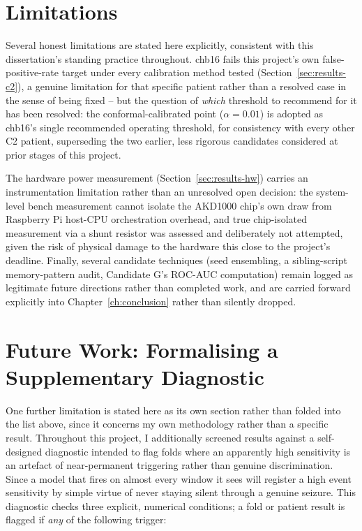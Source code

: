 \section{Limitations}

Several honest limitations are stated here explicitly, consistent with this dissertation's standing practice throughout. chb16 fails this project's own false-positive-rate target under every calibration method tested (Section~\ref{sec:results-c2}), a genuine limitation for that specific patient rather than a resolved case in the sense of being fixed -- but the question of \emph{which} threshold to recommend for it has been resolved: the conformal-calibrated point ($\alpha=0.01$) is adopted as chb16's single recommended operating threshold, for consistency with every other C2 patient, superseding the two earlier, less rigorous candidates considered at prior stages of this project.

The hardware power measurement (Section~\ref{sec:results-hw}) carries an instrumentation limitation rather than an unresolved open decision: the system-level bench measurement cannot isolate the AKD1000 chip's own draw from Raspberry Pi host-CPU orchestration overhead, and true chip-isolated measurement via a shunt resistor was assessed and deliberately not attempted, given the risk of physical damage to the hardware this close to the project's deadline. Finally, several candidate techniques (seed ensembling, a sibling-script memory-pattern audit, Candidate G's ROC-AUC computation) remain logged as legitimate future directions rather than completed work, and are carried forward explicitly into Chapter~\ref{ch:conclusion} rather than silently dropped.

\section{Future Work: Formalising a Supplementary Diagnostic}
\label{sec:collapse-future-work}

One further limitation is stated here as its own section rather than folded into the list above, since it concerns my own methodology rather than a specific result. Throughout this project, I additionally screened results against a self-designed diagnostic intended to flag folds where an apparently high sensitivity is an artefact of near-permanent triggering rather than genuine discrimination. Since a model that fires on almost every window it sees will register a high event sensitivity by simple virtue of never staying silent through a genuine seizure. This diagnostic checks three explicit, numerical conditions; a fold or patient result is flagged if \emph{any} of the following trigger:


